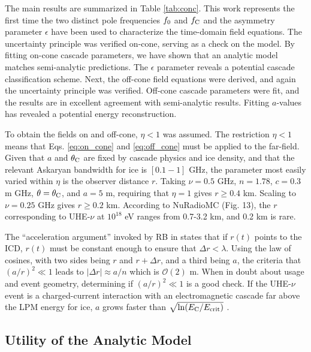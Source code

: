\documentclass[amsmath,amssymb,aps,prd,10pt,twocolumn]{revtex4}
\begin{document}
The main results are summarized in Table \ref{tab:conc}.  This work represents the first time the two distinct pole frequencies $f_{\rm 0}$ and $f_{\rm C}$ and the asymmetry parameter $\epsilon$ have been used to characterize the time-domain field equations.  The uncertainty principle was verified on-cone, serving as a check on the model.  By fitting on-cone cascade parameters, we have shown that an analytic model matches semi-analytic predictions.  The $\epsilon$ parameter reveals a potential cascade classification scheme.  Next, the off-cone field equations were derived, and again the uncertainty principle was verified.  Off-cone cascade parameters were fit, and the results are in excellent agreement with semi-analytic results.  Fitting $a$-values has revealed a potential energy reconstruction.

To obtain the fields on and off-cone, $\eta < 1$ was assumed.  The restriction $\eta < 1$ means that Eqs. \ref{eq:on_cone} and \ref{eq:off_cone} must be applied to the far-field.  Given that $a$ and $\theta_{\rm C}$ are fixed by cascade physics and ice density, and that the relevant Askaryan bandwidth for ice is $[0.1-1]$ GHz, the parameter most easily varied within $\eta$ is the observer distance $r$.  Taking $\nu = 0.5$ GHz, $n = 1.78$, $c = 0.3$ m GHz, $\theta = \theta_{\rm C}$, and $a = 5$ m, requiring that $\eta = 1$ gives $r \geq 0.4$ km.  Scaling to $\nu = 0.25$ GHz gives $r \geq 0.2$ km.  According to NuRadioMC \cite{10.1140/epjc/s10052-020-7612-8} (Fig. 13), the $r$ corresponding to UHE-$\nu$ at $10^{18}$ eV ranges from 0.7-3.2 km, and 0.2 km is rare.

The ``acceleration argument'' invoked by RB in \cite{10.1103/physrevd.65.016003} states that if $r(t)$ points to the ICD, $r(t)$ must be constant enough to ensure that $\Delta r < \lambda$.  Using the law of cosines, with two sides being $r$ and $r+\Delta r$, and a third being $a$, the criteria that $(a/r)^2 \ll 1$ leads to $|\Delta r| \approx a/n$ which is $\mathcal{O}(2)$ m.  When in doubt about usage and event geometry, determining if $(a/r)^2 \ll 1$ is a good check.  If the UHE-$\nu$ event is a charged-current interaction with an electromagnetic cascade far above the LPM energy for ice, $a$ grows faster than $\sqrt{\ln(E_{\rm C}/E_{\rm crit})}$ \cite{10.1103/physrevd.82.074017}.

\subsection{Utility of the Analytic Model}
\end{document}
